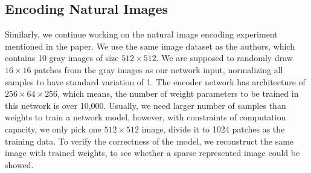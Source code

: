 \subsection{Encoding Natural Images}
Similarly, we continue working on the natural image encoding experiment mentioned in the paper. We use the same image dataset as the authors, which contains 10 gray images of size $512 \times 512$. We are supposed to randomly draw $16 \times 16$ patches from the gray images as our network input, normalizing all samples to have standard variation of 1. The encoder network has architecture of $256\times 64 \times 256$, which means, the number of weight parameters to be trained in this network is over 10,000. Usually, we need larger number of samples than weights to train a network model, however, with constraints of computation capacity, we only pick one $512 \times 512$ image, divide it to 1024 patches as the training data. To verify the correctness of the model, we reconstruct the same image with trained weights, to see whether a sparse represented image could be showed.









